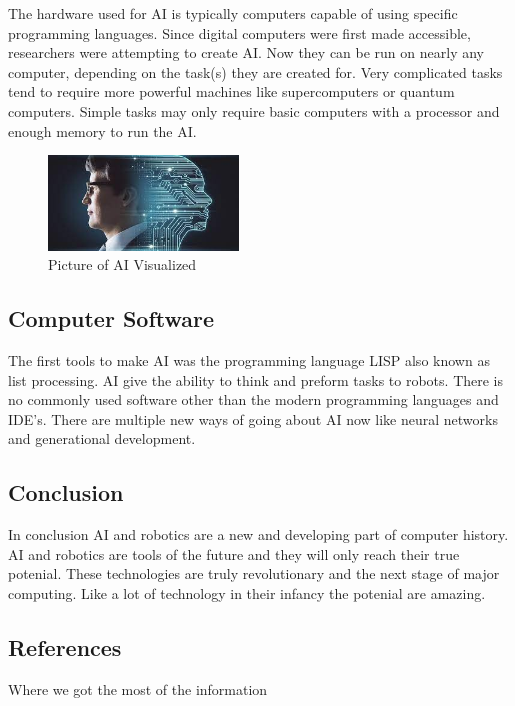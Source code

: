 \documentclass[11pt, twocolumn]{article}
\begin{document}
The hardware used for AI is typically computers capable of using specific programming
languages. Since digital computers were first made accessible, researchers were
attempting to create AI. Now they can be run on nearly any computer, depending on the
task(s) they are created for. Very complicated tasks tend to require more powerful
machines like supercomputers or quantum computers. Simple tasks may only require
basic computers with a processor and enough memory to run the AI.

\begin{figure}
    \centering
    \includegraphics[width=0.45\textwidth]{AI}
    \caption{Picture of AI Visualized}
    \label{fig:AI}
\end{figure}

\subsection{Computer Software}
The first tools to make AI was the programming language LISP also known as list
processing. AI give the ability to think and preform tasks to robots. There is no
commonly used software other than the modern programming languages and IDE's. There
are multiple new ways of going about AI now like neural networks and generational
development.

\subsection{Conclusion}
In conclusion AI and robotics are a new and developing part of computer history.
AI and robotics are tools of the future and they will only reach their true potenial.
These technologies are truly revolutionary and the next stage of major computing.
Like a lot of technology in their infancy the potenial are amazing.
 




\subsection{References}
Where we got the most of the information
\end{document}

